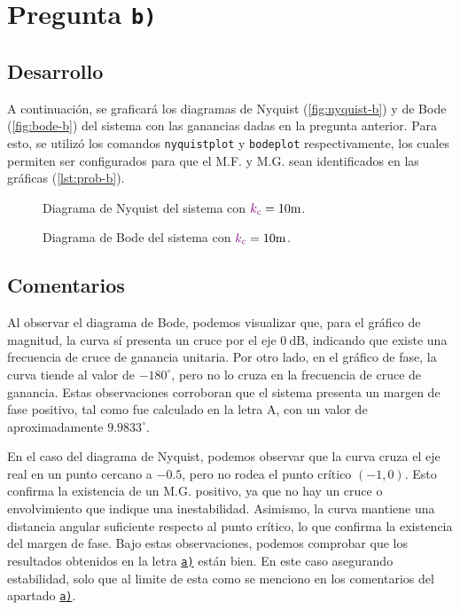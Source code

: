 \section{Pregunta \texttt{b)}}\label{pregunta-b}

\subsection{Desarrollo}

A continuación, se graficará los diagramas de Nyquist (\autoref{fig:nyquist-b})
y de Bode (\autoref{fig:bode-b}) del sistema con las ganancias dadas en la pregunta
anterior. Para esto, se utilizó los comandos \texttt{nyquistplot} y \texttt{bodeplot}
respectivamente, los cuales permiten ser configurados para que el M.F. y M.G. sean
identificados en las gráficas (\autoref{lst:prob-b}).

\begin{figure}[h]
  \centering
  
  \caption{Diagrama de Nyquist del sistema con $\mora{k_{c}} = 10\unit{m}$.}
  \label{fig:nyquist-b}
\end{figure}

\begin{figure}[h]
  \centering
  
  \caption{Diagrama de Bode del sistema con $\mora{k_{c}} = 10\unit{m}$.}
  \label{fig:bode-b}
\end{figure}

\subsection{Comentarios}


Al observar el diagrama de Bode, podemos visualizar que, para el gráfico de magnitud, la curva sí presenta un cruce por el eje \( 0 \ \text{dB} \), indicando que existe una frecuencia de cruce de ganancia unitaria. Por otro lado, en el gráfico de fase, la curva tiende al valor de \(-180^\circ\), pero no lo cruza en la frecuencia de cruce de ganancia. Estas observaciones corroboran que el sistema presenta un margen de fase positivo, tal como fue calculado en la letra A, con un valor de aproximadamente \( 9.9833^\circ \).

En el caso del diagrama de Nyquist, podemos observar que la curva cruza el eje real en un punto cercano a \(-0.5\), pero no rodea el punto crítico \((-1, 0)\). Esto confirma la existencia de un M.G. positivo, ya que no hay un cruce o envolvimiento que indique una inestabilidad. Asimismo, la curva mantiene una distancia angular suficiente respecto al punto crítico, lo que confirma la existencia del margen de fase. Bajo estas observaciones, podemos comprobar que los resultados obtenidos en la letra  \hyperref[pregunta-c]{\texttt{a)}} están bien. En este caso asegurando estabilidad, solo que al limite de esta como se menciono en los comentarios del apartado \hyperref[pregunta-c]{\texttt{a)}}.

